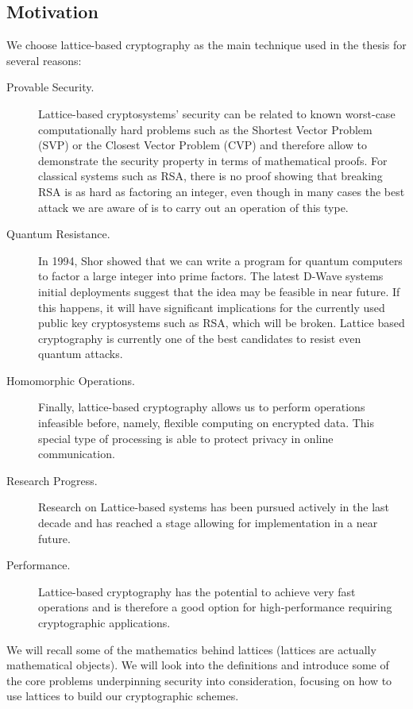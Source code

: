\subsection{Motivation}
\label{ssub:The motivations}
We choose lattice-based cryptography as the main technique used in the
thesis for several reasons:
\begin{description}
\item[Provable Security.] Lattice-based cryptosystems' security can be related
  to known worst-case computationally hard problems such as the Shortest Vector Problem (SVP)
  or the Closest Vector Problem (CVP) and therefore allow to demonstrate the security
  property in terms of mathematical proofs. For classical systems such as RSA,
  there is no proof showing that breaking RSA is as hard as factoring an integer,
  even though in many cases the best attack we are aware of is to carry out an operation of this type.
\item[Quantum Resistance.] In 1994, Shor \cite{shor1994algorithms} showed that
  we can write a program for quantum computers to factor a large integer
  into prime factors. The latest D-Wave systems \cite{korenkevych2016benchmarking} initial deployments suggest that the
  idea may be feasible in near future. If this happens, it will have significant
  implications for the currently used public key cryptosystems such as RSA, which
  will be broken. Lattice based cryptography is currently one of the best
  candidates to resist even quantum attacks.
\item[Homomorphic Operations.] Finally, lattice-based cryptography allows us to
  perform operations infeasible before, namely, flexible computing on encrypted data. This
  special type of processing is able to protect privacy in online
  communication.
\item[Research Progress.] Research on Lattice-based systems has been pursued actively
  in the last decade and has reached a stage allowing for
  implementation in a near future.
\item[Performance.] Lattice-based cryptography has the potential to achieve very
  fast operations and is therefore a good option for high-performance requiring
  cryptographic applications.
\end{description}
We will recall some of the mathematics behind lattices (lattices are actually
mathematical objects). We will look into the definitions and introduce some of the core
problems underpinning security into consideration, focusing on how to use lattices to build our
cryptographic schemes.


